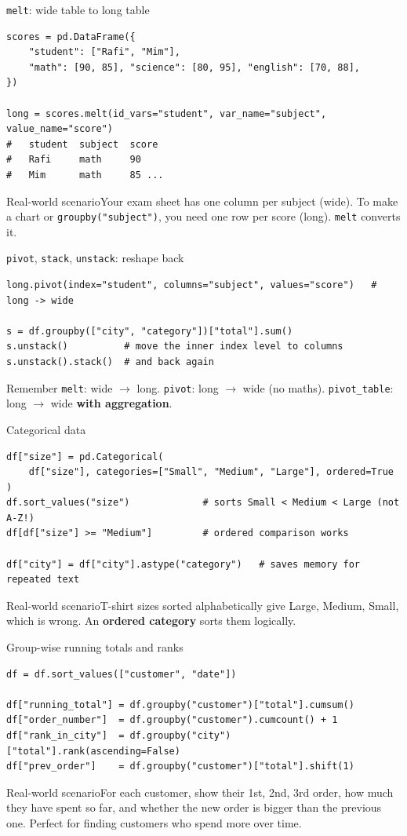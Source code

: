 \documentclass[aspectratio=169,10pt]{beamer}
\newcommand{\code}[1]{\texttt{#1}}
\newcommand{\scenario}[1]{\begin{exampleblock}{Real-world scenario}#1\end{exampleblock}}
\begin{document}
\begin{frame}[fragile]{\texttt{melt}: wide table to long table}
\begin{lstlisting}
scores = pd.DataFrame({
    "student": ["Rafi", "Mim"],
    "math": [90, 85], "science": [80, 95], "english": [70, 88],
})

long = scores.melt(id_vars="student", var_name="subject", value_name="score")
#   student  subject  score
#   Rafi     math     90
#   Mim      math     85 ...
\end{lstlisting}
  \scenario{Your exam sheet has one column per subject (wide). To make a chart or
  \code{groupby("subject")}, you need one row per score (long). \code{melt} converts it.}
\end{frame}

\begin{frame}[fragile]{\texttt{pivot}, \texttt{stack}, \texttt{unstack}: reshape back}
\begin{lstlisting}
long.pivot(index="student", columns="subject", values="score")   # long -> wide

s = df.groupby(["city", "category"])["total"].sum()
s.unstack()          # move the inner index level to columns
s.unstack().stack()  # and back again
\end{lstlisting}
  \begin{block}{Remember}
    \code{melt}: wide $\rightarrow$ long. \code{pivot}: long $\rightarrow$ wide (no maths).
    \code{pivot\_table}: long $\rightarrow$ wide \textbf{with aggregation}.
  \end{block}
\end{frame}

\begin{frame}[fragile]{Categorical data}
\begin{lstlisting}
df["size"] = pd.Categorical(
    df["size"], categories=["Small", "Medium", "Large"], ordered=True
)
df.sort_values("size")             # sorts Small < Medium < Large (not A-Z!)
df[df["size"] >= "Medium"]         # ordered comparison works

df["city"] = df["city"].astype("category")   # saves memory for repeated text
\end{lstlisting}
  \scenario{T-shirt sizes sorted alphabetically give Large, Medium, Small, which is wrong.
  An \textbf{ordered category} sorts them logically.}
\end{frame}

\begin{frame}[fragile]{Group-wise running totals and ranks}
\begin{lstlisting}
df = df.sort_values(["customer", "date"])

df["running_total"] = df.groupby("customer")["total"].cumsum()
df["order_number"]  = df.groupby("customer").cumcount() + 1
df["rank_in_city"]  = df.groupby("city")["total"].rank(ascending=False)
df["prev_order"]    = df.groupby("customer")["total"].shift(1)
\end{lstlisting}
  \scenario{For each customer, show their 1st, 2nd, 3rd order, how much they have spent so
  far, and whether the new order is bigger than the previous one. Perfect for finding
  customers who spend more over time.}
\end{frame}
\end{document}
